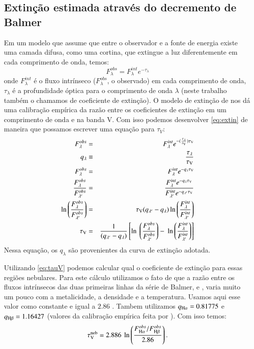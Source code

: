 \subsection{Extinção estimada através do decremento de Balmer}
\label{apendice:EmLinesDataCube:props:tauvneb}
Em um modelo que assume que entre o observador e a fonte de energia existe uma camada difusa, como uma cortina, que extingue a luz diferentemente em cada comprimento de onda, temos:
\begin{equation}
	F_\lambda^{obs} = F_\lambda^{int} e^{-\tau_\lambda}
    \label{eq:extin}
\end{equation}
\noindent onde $F_\lambda^{int}$ é o fluxo intrínseco ($F_\lambda^{obs}$, o observado) em cada comprimento de onda, $\tau_\lambda$ é a profundidade óptica para o comprimento de onda $\lambda$ (neste trabalho também o chamamos de coeficiente de extinção). O modelo de extinção de \citet{CCM1989a} nos dá uma calibração empírica da razão entre os coeficientes de extinção em um comprimento de onda e na banda V. Com isso podemos desenvolver \eqref{eq:extin} de maneira que possamos escrever uma equação para $\tau_V$:
\begin{eqnarray}
   F_\lambda^{obs} &=& F_\lambda^{int} e^{-(\frac{\tau_\lambda}{\tau_{\mathrm{V}}}) \tau_{\mathrm{V}}} \\
   q_\lambda &\equiv& \frac{\tau_\lambda}{\tau_{\mathrm{V}}} \\
   F_\lambda^{obs} &=& F_\lambda^{int} e^{-q_\lambda \tau_{\mathrm{V}}} \\
   \frac{F_\lambda^{obs}}{F_{\lambda^\prime}^{obs}} &=& \
 \frac{F_\lambda^{int} e^{-q_\lambda \tau_{\mathrm{V}}}}{F_{\lambda^\prime}^{int} e^{-q_{\lambda^\prime} \tau_{\mathrm{V}}}} \\
   \ln \left(\frac{F_\lambda^{obs}}{F_{\lambda^\prime}^{obs}}\right) &=& \
 \tau_{\mathrm{V}} (q_{\lambda^\prime} - q_\lambda) \ln \left(\frac{F_\lambda^{int}}{F_{\lambda^\prime}^{int}}\right) \\
   \tau_{\mathrm{V}} &=& \frac{1}{(q_{\lambda^\prime} - q_\lambda)} \left[\ln \
 \left(\frac{F_\lambda^{obs}}{F_{\lambda^\prime}^{obs}}\right) - \
 \ln \left(\frac{F_\lambda^{int}}{F_{\lambda^\prime}^{int}}\right)\right]
 \label{eq:tauV}
\end{eqnarray}
\noindent Nessa equação, os $q_\lambda$ são provenientes da curva de extinção adotada.

Utilizando \eqref{eq:tauV} podemos calcular qual o coeficiente de extinção para essas regiões nebulares. Para este cálculo utilizamos o fato de que a razão entre os fluxos intrínsecos das duas primeiras linhas da série de Balmer, \Ha e \Hb, varia muito um pouco com a metalicidade, a densidade e a temperatura. Usamos aqui esse valor como constante e igual a $2.86$ \citep[densidade eletrônica de $n = 100\ cm^{-3}$ e temperatura eletrônica $T_e = 10^4$ K; ][]{Osterbrock.Ferland.2006a}. Tambem utilizamos $q_{\Ha}  = 0.81775$ e $q_{\Hb} = 1.16427$ (valores da calibração empírica feita por \citeauthor{CCM1989a}). Com isso temos:
\begin{equation}
	\tauVN = 2.886\ \ln \left( \frac{F_{\Ha}^{obs}/F_{\Hb}^{obs}}{2.86} \right).
\end{equation}

